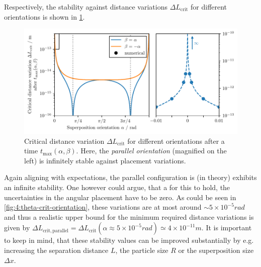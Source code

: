 Respectively, the stability against distance variations $\Delta L_\mathrm{crit}$ for different orientations is shown in \cref{fig:4:L-crit-orientation}.
\begin{figure}[!htbp]
  \centering
  \includegraphics[width=\textwidth]{./../figures/L-variance/L-crit-orientation-complete.pdf}
  \caption{Critical distance variation $\Delta L_\mathrm{crit}$ for different orientations after a time $t_\mathrm{max}(\alpha,\beta)$. Here, the \emph{parallel orientation} (magnified on the left) is infinitely stable against placement variations.}
  \label{fig:4:L-crit-orientation}
\end{figure}
Again aligning with expectations, the parallel configuration is (in theory) exhibits an infinite stability.
One however could argue, that a for this to hold, the uncertainties in the angular placement have to be zero. As could be seen in \cref{fig:4:theta-crit-orientation}, these variations are at most around $\sim 5 \times 10^{-5}\si{rad}$ and thus a realistic upper bound for the minimum required distance variations is given by $\Delta L_\mathrm{crit,parallel} = \Delta L_\mathrm{crit}(\alpha \approx 5\times 10^{-5}\si{rad}) \simeq 4\times 10^{-11}\si{m}$.
It is important to keep in mind, that these stability values can be improved substantially by e.g. increasing the separation distance $L$, the particle size $R$ or the superposition size $\Delta x$.


